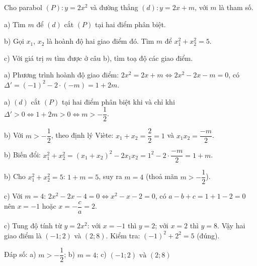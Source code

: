 \begin{problem}[9DS-HSB2-045]
Cho parabol $(P)\colon y = 2x^2$ và đường thẳng $(d)\colon y = 2x + m$, với $m$ là tham số.

a) Tìm $m$ để $(d)$ cắt $(P)$ tại hai điểm phân biệt.

b) Gọi $x_1$, $x_2$ là hoành độ hai giao điểm đó. Tìm $m$ để $x_1^2 + x_2^2 = 5$.

c) Với giá trị $m$ tìm được ở câu b), tìm toạ độ các giao điểm.

\begin{solution}
a) Phương trình hoành độ giao điểm: $2x^2 = 2x + m \Leftrightarrow 2x^2 - 2x - m = 0$, có $\Delta' = (-1)^2 - 2 \cdot (-m) = 1 + 2m$.

a) $(d)$ cắt $(P)$ tại hai điểm phân biệt khi và chỉ khi $\Delta' > 0 \Leftrightarrow 1 + 2m > 0 \Leftrightarrow m > -\dfrac{1}{2}$.

b) Với $m > -\dfrac{1}{2}$, theo định lý Viète: $x_1 + x_2 = \dfrac{2}{2} = 1$ và $x_1x_2 = \dfrac{-m}{2}$.

b) Biến đổi: $x_1^2 + x_2^2 = (x_1 + x_2)^2 - 2x_1x_2 = 1^2 - 2 \cdot \dfrac{-m}{2} = 1 + m$.

b) Cho $x_1^2 + x_2^2 = 5$: $1 + m = 5$, suy ra $m = 4$ (thoả mãn $m > -\dfrac{1}{2}$).

c) Với $m = 4$: $2x^2 - 2x - 4 = 0 \Leftrightarrow x^2 - x - 2 = 0$, có $a - b + c = 1 + 1 - 2 = 0$ nên $x = -1$ hoặc $x = -\dfrac{c}{a} = 2$.

c) Tung độ tính từ $y = 2x^2$: với $x = -1$ thì $y = 2$; với $x = 2$ thì $y = 8$. Vậy hai giao điểm là $(-1; 2)$ và $(2; 8)$. Kiểm tra: $(-1)^2 + 2^2 = 5$ (đúng).

Đáp số: a) $\boxed{m > -\dfrac{1}{2}}$; b) $\boxed{m = 4}$; c) $\boxed{(-1; 2) \text{ và } (2; 8)}$
\end{solution}
\end{problem}

